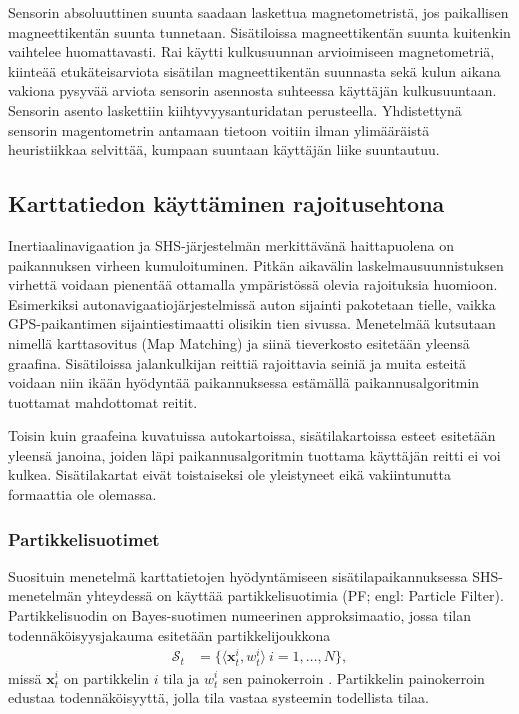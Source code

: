 Sensorin absoluuttinen suunta saadaan laskettua magnetometristä, jos
paikallisen magneettikentän suunta tunnetaan. Sisätiloissa magneettikentän
suunta kuitenkin vaihtelee huomattavasti. Rai \cite{rai2012} käytti
kulkusuunnan arvioimiseen magnetometriä, kiinteää etukäteisarviota sisätilan
magneettikentän suunnasta sekä kulun aikana vakiona pysyvää arviota sensorin
asennosta suhteessa käyttäjän kulkusuuntaan. Sensorin asento laskettiin
kiihtyvyysanturidatan perusteella. Yhdistettynä sensorin magentometrin antamaan
tietoon voitiin ilman ylimääräistä heuristiikkaa selvittää, kumpaan suuntaan
käyttäjän liike suuntautuu.

\subsection{Karttatiedon käyttäminen rajoitusehtona}

Inertiaalinavigaation ja SHS-järjestelmän merkittävänä haittapuolena on
paikannuksen virheen kumuloituminen. Pitkän aikavälin laskelmausuunnistuksen
virhettä voidaan pienentää ottamalla ympäristössä olevia rajoituksia huomioon.
Esimerkiksi autonavigaatiojärjestelmissä auton sijainti pakotetaan tielle,
vaikka GPS-paikantimen sijaintiestimaatti olisikin tien sivussa.  Menetelmää
kutsutaan nimellä karttasovitus (Map Matching) ja siinä tieverkosto esitetään
yleensä graafina. Sisätiloissa jalankulkijan reittiä rajoittavia seiniä ja
muita esteitä voidaan niin ikään hyödyntää paikannuksessa estämällä
paikannusalgoritmin tuottamat mahdottomat reitit.

Toisin kuin graafeina kuvatuissa autokartoissa, sisätilakartoissa esteet
esitetään yleensä janoina, joiden läpi paikannusalgoritmin tuottama käyttäjän
reitti ei voi kulkea. Sisätilakartat eivät toistaiseksi ole yleistyneet eikä
vakiintunutta formaattia ole olemassa.

\subsubsection{Partikkelisuotimet}

Suosituin menetelmä karttatietojen hyödyntämiseen sisätilapaikannuksessa
SHS-menetelmän yhteydessä on käyttää partikkelisuotimia (PF; engl: Particle
Filter).  Partikkelisuodin on Bayes-suotimen numeerinen approksimaatio, jossa
tilan todennäköisyysjakauma esitetään partikkelijoukkona
\begin{align}
\mathcal{S}_t &= \{\langle\mathbf{x}_t^i,w_t^i\rangle \ i = 1,\ldots,N\},
\end{align}
missä $\mathbf{x}_t^i$ on partikkelin $i$ tila ja $w_t^i$ sen painokerroin
\cite{woodman2010}.
Partikkelin painokerroin edustaa todennäköisyyttä, jolla tila vastaa systeemin
todellista tilaa.

